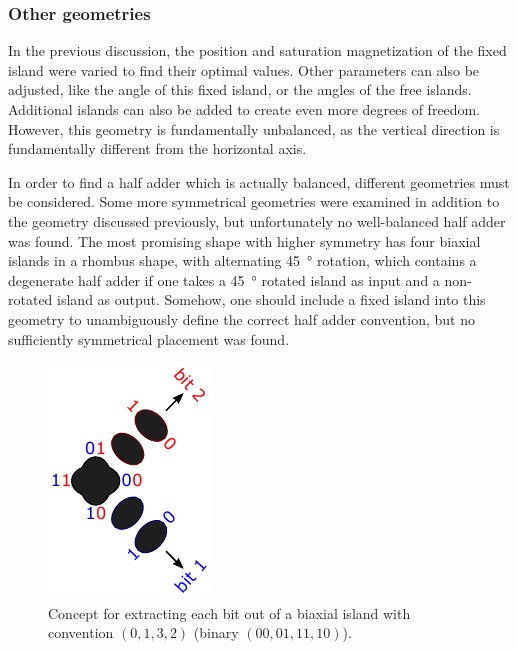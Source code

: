 \documentclass[11pt,a4paper,english]{article}
\begin{document}
\subsubsection{Other geometries}
In the previous discussion, the position and saturation magnetization of the fixed island were varied to find their optimal values. Other parameters can also be adjusted, like the angle of this fixed island, or the angles of the free islands. Additional islands can also be added to create even more degrees of freedom. However, this geometry is fundamentally unbalanced, as the vertical direction is fundamentally different from the horizontal axis. \par
In order to find a half adder which is actually balanced, different geometries must be considered. Some more symmetrical geometries were examined in addition to the geometry discussed previously, but unfortunately no well-balanced half adder was found. The most promising shape with higher symmetry has four biaxial islands in a rhombus shape, with alternating \SI{45}{\degree} rotation, which contains a degenerate half adder if one takes a \SI{45}{\degree} rotated island as input and a non-rotated island as output. Somehow, one should include a fixed island into this geometry to unambiguously define the correct half adder convention, but no sufficiently symmetrical placement was found. \par\begin{figure}
    \centering
    \includegraphics[width=0.3\columnwidth]{Figures/Introduction/0132_biaxial_to_uniaxial.pdf}
    \caption{Concept for extracting each bit out of a biaxial island with convention $(0,1,3,2)$ (binary $(00,01,11,10)$).}
    \label{fig:halfadder_concept_0132_biaxial_to_uniaxial}
\end{figure}
\end{document}
